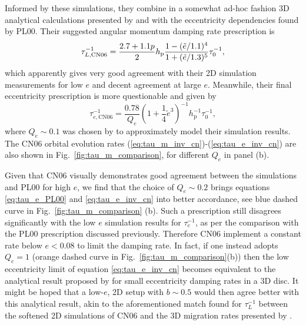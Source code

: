 
Informed by these simulations, they combine in a somewhat ad-hoc fashion 3D analytical calculations presented by \cite{TanakaEtAl_2002} and \citet{TanakaWard_2004} with the eccentricity dependencies found by PL00. Their suggested angular momentum damping rate prescription is 
%
\begin{equation}
    \label{eq:tau_m_inv_cn}
    \tau_{L,\textrm{CN06}}^{-1} = \frac{2.7+1.1 p}{2} h_\textrm{p} \frac{1-(\Tilde{e}/1.1)^4}{1+(\Tilde{e}/1.3)^5}\tau_0^{-1} ,
\end{equation}
%
which apparently gives very good agreement with their 2D simulation measurements for low $e$ and decent agreement at large $e$. Meanwhile, their final eccentricity prescription is more questionable and given by
%
\begin{equation}
\label{eq:tau_e_inv_cn}
    \tau_{e,\textrm{CN06}}^{-1} = 
    \frac{0.78}{Q_e} \left(1+\frac{1}{4}\tilde{e}^3\right)^{-1} h_{\textrm{p}}^{-1}\tau_0^{-1} ,
\end{equation}
%
where $Q_{e}\sim 0.1$ was chosen by \cite{CresswellNelson_2006} to approximately model their simulation results. The CN06 orbital evolution rates (\ref{eq:tau_m_inv_cn})-(\ref{eq:tau_e_inv_cn}) are also shown in Fig.~\ref{fig:tau_m_comparison}, for different $Q_e$ in panel (b).

Given that CN06 visually demonstrates good agreement between the simulations and PL00 for high $e$, we find that the choice of $Q_e \sim 0.2$ brings equations \eqref{eq:tau_e_PL00} and \eqref{eq:tau_e_inv_cn} into better accordance, see blue dashed curve in Fig.~\ref{fig:tau_m_comparison} (b). Such a prescription still disagrees significantly with the low $e$ simulation results for $\tau_{e}^{-1}$, as per the comparison with the PL00 prescription discussed previously. Therefore CN06 implement a constant rate below $e<0.08$ to limit the damping rate. In fact, if one instead adopts $Q_e = 1$ (orange dashed curve in Fig.~\ref{fig:tau_m_comparison}(b)) then the low eccentricity limit of equation \eqref{eq:tau_e_inv_cn} becomes  equivalent to the analytical result proposed by \cite{TanakaWard_2004} for small eccentricity damping rates in a 3D disc. It might be hoped that a low-$e$, 2D setup with $b \sim 0.5$ would then agree better with this analytical result, akin to the aforementioned match found for $\tau_{L}^{-1}$ between the softened 2D simulations of CN06 and the 3D migration rates presented by \cite{TanakaEtAl_2002}.

